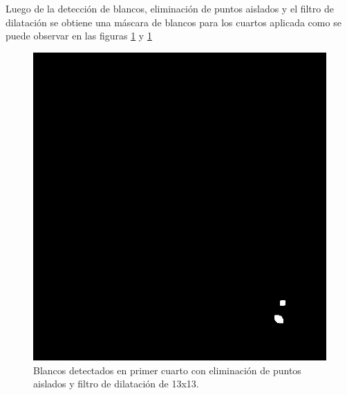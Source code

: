 \documentclass[10pt,a4paper, twoside]{report}
\begin{document}
Luego de la detección de blancos, eliminación de puntos aislados y el filtro de dilatación se obtiene una máscara de blancos para los cuartos aplicada como se puede observar en las figuras \ref{firstQuarterMask} y \ref{firstQuarterMask}


\begin{figure}[!htb]
   \begin{minipage}{0.48\textwidth}
			\centering
			\includegraphics[width=1.0\linewidth]{imagenes/fstQuarterFourierMask.jpg}
			\caption{Blancos detectados en primer cuarto con eliminación de puntos aislados y filtro de dilatación de 13x13.}
			\label{firstQuarterMask}
   \end{minipage}\hfill
   \begin {minipage}{0.48\textwidth}
			\centering

\end{minipage}
\end{figure}
\end{document}
